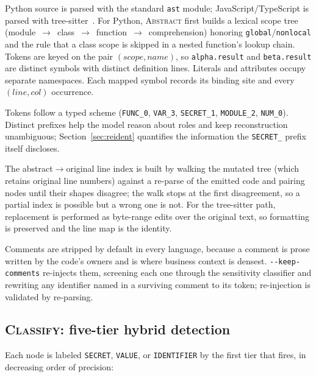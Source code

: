 \documentclass[conference]{IEEEtran}
\begin{document}
Python source is parsed with the standard \texttt{ast} module;
JavaScript/TypeScript is parsed with tree-sitter~\cite{treesitter}. For
Python, \textsc{Abstract} first builds a lexical scope tree
(module~$\rightarrow$~class~$\rightarrow$~function~$\rightarrow$~comprehension)
honoring \texttt{global}/\texttt{nonlocal} and the rule that a class scope
is skipped in a nested function's lookup chain. Tokens are keyed on the
pair $(\textit{scope}, \textit{name})$, so \texttt{alpha.result} and
\texttt{beta.result} are distinct symbols with distinct definition lines.
Literals and attributes occupy separate namespaces. Each mapped symbol
records its binding site and every $(\textit{line}, \textit{col})$
occurrence.

Tokens follow a typed scheme (\texttt{FUNC\_0}, \texttt{VAR\_3},
\texttt{SECRET\_1}, \texttt{MODULE\_2}, \texttt{NUM\_0}). Distinct prefixes
help the model reason about roles and keep reconstruction unambiguous;
Section~\ref{sec:reident} quantifies the information the \texttt{SECRET\_}
prefix itself discloses.

The abstract$\rightarrow$original line index is built by walking the
mutated tree (which retains original line numbers) against a re-parse of
the emitted code and pairing nodes until their shapes disagree; the walk
stops at the first disagreement, so a partial index is possible but a
wrong one is not. For the tree-sitter path, replacement is performed as
byte-range edits over the original text, so formatting is preserved and
the line map is the identity.

Comments are stripped by default in every language, because a comment is
prose written by the code's owners and is where business context is
densest. \texttt{-{}-keep-comments} re-injects them, screening each one
through the sensitivity classifier and rewriting any identifier named in a
surviving comment to its token; re-injection is validated by re-parsing.

\subsection{\textsc{Classify}: five-tier hybrid detection}
\label{sec:classify}

Each node is labeled \texttt{SECRET}, \texttt{VALUE}, or
\texttt{IDENTIFIER} by the first tier that fires, in decreasing order of
precision:
\end{document}
